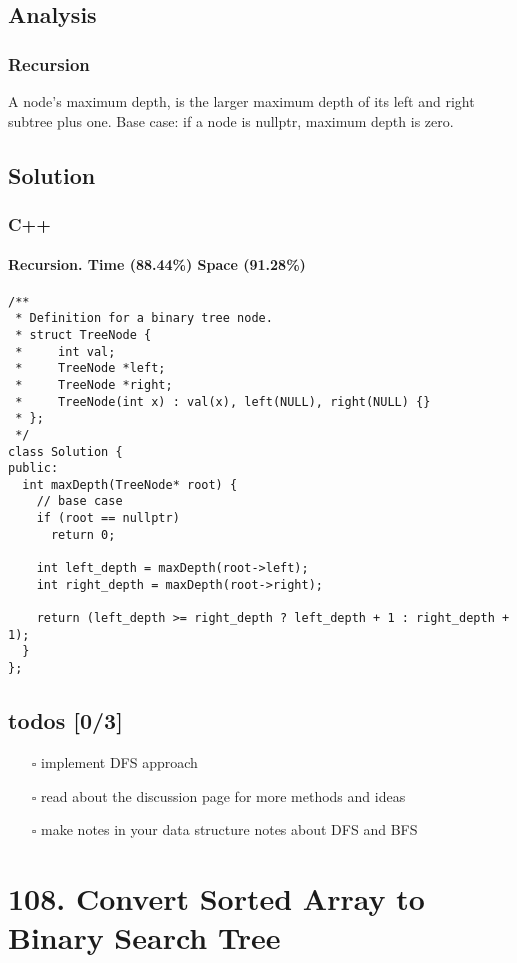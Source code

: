 \documentclass[12pt]{article}
\begin{document}
\subsection{Analysis}
\label{sec:org44ebee2}
\subsubsection{Recursion}
\label{sec:org76ba31e}
A node's maximum depth, is the larger maximum depth of its left and right subtree plus one. Base case: if a node is nullptr, maximum depth is zero.
\subsection{Solution}
\label{sec:org9d4fe92}
\subsubsection{C++}
\label{sec:org39a188d}
\paragraph{Recursion. Time (88.44\%) Space (91.28\%)}
\label{sec:orgb4be1c9}
\begin{verbatim}
/**
 * Definition for a binary tree node.
 * struct TreeNode {
 *     int val;
 *     TreeNode *left;
 *     TreeNode *right;
 *     TreeNode(int x) : val(x), left(NULL), right(NULL) {}
 * };
 */
class Solution {
public:
  int maxDepth(TreeNode* root) {
    // base case 
    if (root == nullptr)
      return 0;

    int left_depth = maxDepth(root->left);
    int right_depth = maxDepth(root->right);

    return (left_depth >= right_depth ? left_depth + 1 : right_depth + 1);
  }
};
\end{verbatim}
\subsection{todos [0/3]}
\label{sec:orga3f17f3}
\begin{itemize}
\item[{$\square$}] implement DFS approach
\item[{$\square$}] read about the discussion page for more methods and ideas
\item[{$\square$}] make notes in your data structure notes about DFS and BFS
\end{itemize}
\section{108. Convert Sorted Array to Binary Search Tree}
\label{sec:org31a7688}
\end{document}

